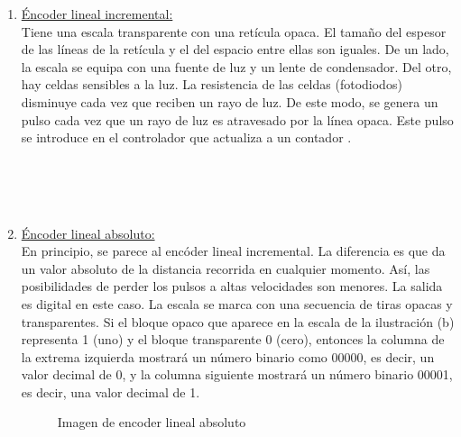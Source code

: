 \begin{enumerate}
\begin{enumerate}
\begin{enumerate}
			\begin{enumerate}
				\item \underline{Éncoder lineal incremental:} \\
				Tiene una
				escala transparente con una retícula opaca. El tamaño del espesor de las líneas de la retícula y el del espacio entre ellas son iguales. De un lado, la escala se equipa con una fuente de luz y un lente de condensador. Del otro, hay celdas sensibles a la luz. La resistencia de las celdas (fotodiodos) disminuye cada vez que reciben un rayo de luz. De este modo, se genera un pulso cada vez que un rayo de luz es atravesado por la línea opaca. Este pulso se introduce en el controlador que actualiza a un contador \cite{saha2010robotics}.
				\\
		\begin{figure}[h]
	\centering
	\hfill
\end{figure}				
\\
\\
\\
				\item \underline{Éncoder lineal absoluto:} \\
				En principio, se parece al encóder lineal incremental.  La diferencia es que da un valor absoluto de la distancia recorrida en cualquier momento. Así,
				las posibilidades de perder los pulsos a altas velocidades son menores. La salida es digital
				en este caso. La escala se marca con una secuencia de tiras opacas y transparentes. Si el bloque opaco que aparece en la escala de la ilustración (b)  representa 1 (uno) y el bloque transparente 0 (cero), entonces la columna de la extrema izquierda mostrará un número binario como 00000, es decir, un valor decimal de 0, y la columna siguiente mostrará un número binario 00001, es decir, una valor decimal de 1.\cite{saha2010robotics}
				
				\begin{figure}[h]
					\centering
					\hfill
					\caption{Imagen de encoder lineal absoluto}
					\label{fig:mascotas}
				\end{figure}
				

\end{enumerate}
\end{enumerate}
\end{enumerate}
\end{enumerate}
